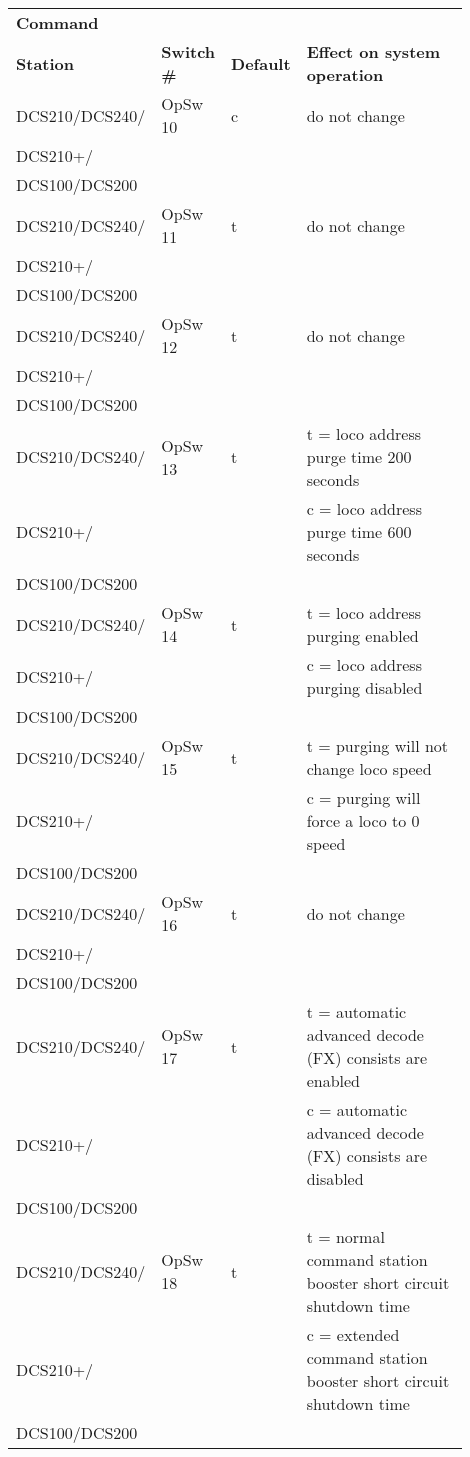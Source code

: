 \newpage
\begin{tabular}{|p{0.2\linewidth}|p{0.125\linewidth}|p{0.1\linewidth}|p{0.475\linewidth}|} 
\hline
\textbf{Command} &&&\\
\textbf{Station} & \textbf{Switch \#} & \textbf{Default} & \textbf{Effect on system operation}\\
\hline
DCS210/DCS240/ & OpSw 10 & c & do not change\\
DCS210+/ &&&\\
DCS100/DCS200 &&&\\
\hline
DCS210/DCS240/ & OpSw 11 & t & do not change\\
DCS210+/ &&&\\
DCS100/DCS200 &&&\\
\hline
DCS210/DCS240/ & OpSw 12 & t & do not change\\
DCS210+/ &&&\\
DCS100/DCS200 &&&\\
\hline
DCS210/DCS240/ & OpSw 13 & t & t = loco address purge time 200 seconds\\
DCS210+/& & & c = loco address purge time 600 seconds\\
DCS100/DCS200 &&&\\
\hline
DCS210/DCS240/ & OpSw 14 & t & t = loco address purging enabled\\
DCS210+/&&& c = loco address purging disabled\\
DCS100/DCS200 &&&\\
\hline
DCS210/DCS240/ & OpSw 15 & t & t = purging will not change loco speed\\
DCS210+/&&& c = purging will force a loco to 0 speed\\
DCS100/DCS200 &&&\\
\hline
DCS210/DCS240/ & OpSw 16 & t & do not change\\
DCS210+/ &&&\\
DCS100/DCS200 &&&\\
\hline
DCS210/DCS240/ & OpSw 17 & t & t = automatic advanced decode (FX) consists are enabled\\
DCS210+/&&& c = automatic advanced decode (FX) consists are disabled\\
DCS100/DCS200 &&&\\
\hline
DCS210/DCS240/ & OpSw 18 & t & t = normal command station booster short circuit shutdown time\\
DCS210+/&&& c = extended command station booster short circuit shutdown time\\
DCS100/DCS200 &&&\\

\end{tabular}

